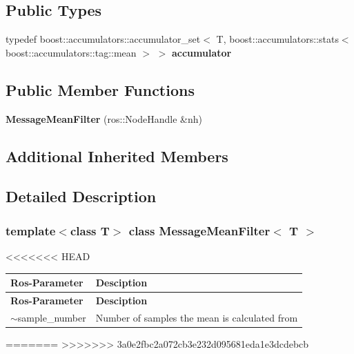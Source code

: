 \subsection*{Public Types}
\begin{DoxyCompactItemize}
\item 
\mbox{\label{classMessageMeanFilter_aabbf6eb4a2e2251228ece38f88609d29}} 
typedef boost\+::accumulators\+::accumulator\+\_\+set$<$ T, boost\+::accumulators\+::stats$<$ boost\+::accumulators\+::tag\+::mean $>$ $>$ {\bfseries accumulator}
\end{DoxyCompactItemize}
\subsection*{Public Member Functions}
\begin{DoxyCompactItemize}
\item 
\mbox{\label{classMessageMeanFilter_a613460b271336914553f2beb05f4da9b}} 
{\bfseries Message\+Mean\+Filter} (ros\+::\+Node\+Handle \&nh)
\end{DoxyCompactItemize}
\subsection*{Additional Inherited Members}


\subsection{Detailed Description}
\subsubsection*{template$<$class T$>$\newline
class Message\+Mean\+Filter$<$ T $>$}

<<<<<<< HEAD
\tabulinesep=1mm
\begin{longtabu} spread 0pt [c]{*{2}{|X[-1]}|}
\hline
\rowcolor{\tableheadbgcolor}\textbf{ Ros-\/\+Parameter }&\textbf{ Desciption  }\\
\endfirsthead
\hline
\endfoot
\hline
\rowcolor{\tableheadbgcolor}\textbf{ Ros-\/\+Parameter }&\textbf{ Desciption  }\\
\endhead
$\sim$sample\+\_\+number &Number of samples the mean is calculated from \\
\end{longtabu}
=======
>>>>>>> 3a0e2fbc2a072cb3e232d095681eda1e3dcdebcb

